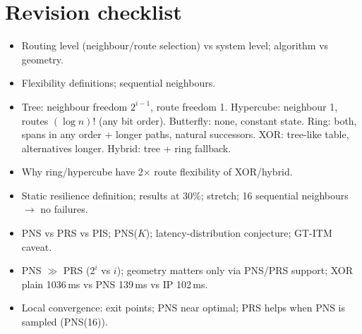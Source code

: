 \section{Revision checklist}
\begin{itemize}
  \item Routing level (neighbour/route selection) vs system level; algorithm vs geometry.
  \item Flexibility definitions; sequential neighbours.
  \item Tree: neighbour freedom $2^{i-1}$, route freedom 1. Hypercube: neighbour 1, routes $(\log n)!$ (any bit order). Butterfly: none, constant state. Ring: both, spans in
        any order + longer paths, natural successors. XOR: tree-like table, alternatives longer. Hybrid: tree + ring fallback.
  \item Why ring/hypercube have 2$\times$ route flexibility of XOR/hybrid.
  \item Static resilience definition; results at 30\%; stretch; 16 sequential neighbours $\to$ no failures.
  \item PNS vs PRS vs PIS; PNS($K$); latency-distribution conjecture; GT-ITM caveat.
  \item PNS $\gg$ PRS ($2^i$ vs $i$); geometry matters only via PNS/PRS support; XOR plain 1036\,ms vs PNS 139\,ms vs IP 102\,ms.
  \item Local convergence: exit points; PNS near optimal; PRS helps when PNS is sampled (PNS(16)).
\end{itemize}

